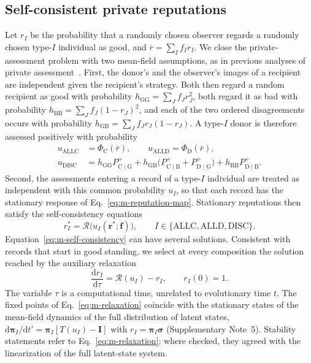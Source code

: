 \subsection*{Self-consistent private reputations}

Let $r_I$ be the probability that a randomly chosen observer regards a randomly
chosen type-$I$ individual as good, and $\bar r=\sum_I f_I r_I$. We close the
private-assessment problem with two mean-field assumptions, as in previous
analyses of private assessment~\cite{okada2018,radzvilavicius2019,kessinger2023,michelmata2024,kawakatsu2024}.
First, the donor's and the observer's images of a recipient are independent
given the recipient's strategy. Both then regard a random recipient as good
with probability $h_{\mathrm{GG}}=\sum_J f_J r_J^2$, both regard it as bad with
probability $h_{\mathrm{BB}}=\sum_J f_J(1-r_J)^2$, and each of the two ordered
disagreements occurs with probability $h_{\mathrm{GB}}=\sum_J f_J r_J(1-r_J)$.
A type-$I$ donor is therefore assessed positively with probability
\begin{equation}
\begin{aligned}
u_{\mathrm{ALLC}}&=\Phi_{\mathrm C}(\bar r),\qquad
u_{\mathrm{ALLD}}=\Phi_{\mathrm D}(\bar r),\\
u_{\mathrm{DISC}}&=h_{\mathrm{GG}}P^+_{\mathrm C\mid\mathrm G}
+h_{\mathrm{GB}}\bigl(P^+_{\mathrm C\mid\mathrm B}+P^+_{\mathrm D\mid\mathrm G}\bigr)
+h_{\mathrm{BB}}P^+_{\mathrm D\mid\mathrm B}.
\end{aligned}
\label{eq:m-strategy-assessment}
\end{equation}
Second, the assessments entering a record of a type-$I$ individual are treated
as independent with this common probability $u_I$, so that each record has
the stationary response of Eq.~\eqref{eq:m-reputation-map}. Stationary
reputations then satisfy the self-consistency equations
\begin{equation}
r_I^*=\mathcal R\bigl(u_I(\boldsymbol r^*;\boldsymbol f)\bigr),
\qquad I\in\{\mathrm{ALLC},\mathrm{ALLD},\mathrm{DISC}\}.
\label{eq:m-self-consistency}
\end{equation}
Equation~\eqref{eq:m-self-consistency} can have several solutions. Consistent
with records that start in good standing, we select at every composition the
solution reached by the auxiliary relaxation
\begin{equation}
\frac{\mathrm d r_I}{\mathrm d\tau}=\mathcal R(u_I)-r_I,\qquad r_I(0)=1 .
\label{eq:m-relaxation}
\end{equation}
The variable $\tau$ is a computational time, unrelated to evolutionary time
$t$. The fixed points of Eq.~\eqref{eq:m-relaxation} coincide with the
stationary states of the mean-field dynamics of the full distribution of
latent states, $\mathrm d\boldsymbol\pi_I/\mathrm dt'=\boldsymbol\pi_I[T(u_I)-\mathbf I]$
with $r_I=\boldsymbol\pi_I\boldsymbol\sigma$ (Supplementary Note~5). Stability
statements refer to Eq.~\eqref{eq:m-relaxation}; where checked, they agreed
with the linearization of the full latent-state system.

